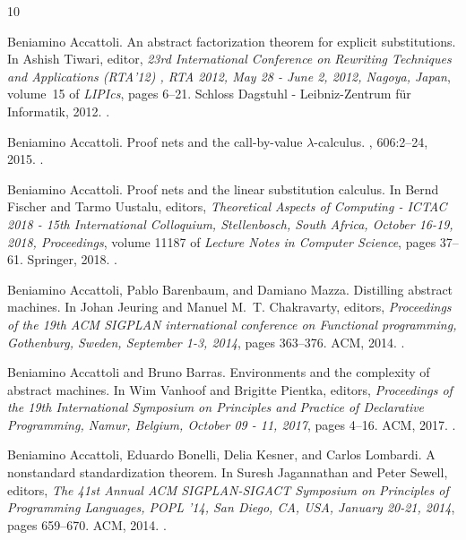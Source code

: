 \documentclass[10pt,a4paper]{article}
\theoremstyle{remark}
\begin{document}
\begin{thebibliography}{10}

Beniamino Accattoli.
\newblock An abstract factorization theorem for explicit substitutions.
\newblock In Ashish Tiwari, editor, {\em 23rd International Conference on
  Rewriting Techniques and Applications (RTA'12) , {RTA} 2012, May 28 - June 2,
  2012, Nagoya, Japan}, volume~15 of {\em LIPIcs}, pages 6--21. Schloss
  Dagstuhl - Leibniz-Zentrum f{\"{u}}r Informatik, 2012.
\newblock \href {https://doi.org/10.4230/LIPICS.RTA.2012.6}
  {}.

Beniamino Accattoli.
\newblock Proof nets and the call-by-value {\(\lambda\)}-calculus.
, 606:2--24, 2015.
\newblock \href {https://doi.org/10.1016/J.TCS.2015.08.006}
  {}.

Beniamino Accattoli.
\newblock Proof nets and the linear substitution calculus.
\newblock In Bernd Fischer and Tarmo Uustalu, editors, {\em Theoretical Aspects
  of Computing - {ICTAC} 2018 - 15th International Colloquium, Stellenbosch,
  South Africa, October 16-19, 2018, Proceedings}, volume 11187 of {\em Lecture
  Notes in Computer Science}, pages 37--61. Springer, 2018.
\newblock \href {https://doi.org/10.1007/978-3-030-02508-3\_3}
  {}.

Beniamino Accattoli, Pablo Barenbaum, and Damiano Mazza.
\newblock Distilling abstract machines.
\newblock In Johan Jeuring and Manuel M.~T. Chakravarty, editors, {\em
  Proceedings of the 19th {ACM} {SIGPLAN} international conference on
  Functional programming, Gothenburg, Sweden, September 1-3, 2014}, pages
  363--376. {ACM}, 2014.
\newblock \href {https://doi.org/10.1145/2628136.2628154}
  {}.

Beniamino Accattoli and Bruno Barras.
\newblock Environments and the complexity of abstract machines.
\newblock In Wim Vanhoof and Brigitte Pientka, editors, {\em Proceedings of the
  19th International Symposium on Principles and Practice of Declarative
  Programming, Namur, Belgium, October 09 - 11, 2017}, pages 4--16. {ACM},
  2017.
\newblock \href {https://doi.org/10.1145/3131851.3131855}
  {}.

Beniamino Accattoli, Eduardo Bonelli, Delia Kesner, and Carlos Lombardi.
\newblock A nonstandard standardization theorem.
\newblock In Suresh Jagannathan and Peter Sewell, editors, {\em The 41st Annual
  {ACM} {SIGPLAN-SIGACT} Symposium on Principles of Programming Languages,
  {POPL} '14, San Diego, CA, USA, January 20-21, 2014}, pages 659--670. {ACM},
  2014.
\newblock \href {https://doi.org/10.1145/2535838.2535886}
  {}.


\end{thebibliography}
\end{document}
